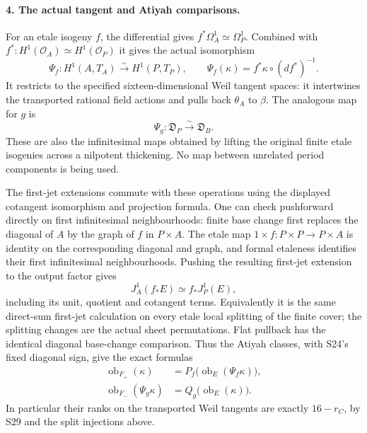 \paragraph{4. The actual tangent and Atiyah comparisons.}
For an etale isogeny $f$, the differential gives
$f^*\Omega_A^1\simeq\Omega_P^1$. Combined with
$f^*:H^1(\mathcal O_A)\simeq H^1(\mathcal O_P)$
it gives the actual isomorphism
\[
 \Psi_f:H^1(A,T_A)\xrightarrow{\sim}H^1(P,T_P),
 \qquad
 \Psi_f(\kappa)=f^*\kappa\circ(df^*)^{-1}.
 \tag{F1S30.12}
\]
It restricts to the specified sixteen-dimensional
Weil tangent spaces: it intertwines the transported
rational field actions and pulls back $\theta_A$
to $\beta$. The analogous map for $g$ is
\[
                     \Psi_g:\mathfrak D_P\xrightarrow{\sim}
                                               \mathfrak D_B.
 \tag{F1S30.13}
\]
These are also the infinitesimal maps obtained by
lifting the original finite etale isogenies across
a nilpotent thickening. No map between unrelated
period components is being used.

The first-jet extensions commute with these
operations using the displayed cotangent
isomorphism and projection formula. One can
check pushforward directly on first infinitesimal
neighbourhoods: finite base change first replaces
the diagonal of $A$ by the graph of $f$ in
$P\times A$. The etale map $1\times f:P\times P
\to P\times A$ is identity on the corresponding
diagonal and graph, and formal etaleness identifies
their first infinitesimal neighbourhoods.
Pushing the resulting first-jet extension to
the output factor gives
\[
               J_A^1(f_*E)\simeq f_*J_P^1(E),
 \tag{F1S30.14}
\]
including its unit, quotient and cotangent terms.
Equivalently it is the same direct-sum first-jet
calculation on every etale local splitting of
the finite cover; the splitting changes are
the actual sheet permutations. Flat pullback
has the identical diagonal base-change comparison.
Thus the Atiyah classes, with S24's fixed diagonal
sign, give the exact formulas
\[
 \begin{split}
 \operatorname{ob}_{F_+}(\kappa)
     &=P_f\bigl(\operatorname{ob}_E(\Psi_f\kappa)\bigr),\\
 \operatorname{ob}_{F_-}(\Psi_g\kappa)
     &=Q_g\bigl(\operatorname{ob}_E(\kappa)\bigr).
 \end{split}
 \tag{F1S30.15}
\]
In particular their ranks on the transported Weil
tangents are exactly $16-r_C$, by S29 and the
split injections above.

